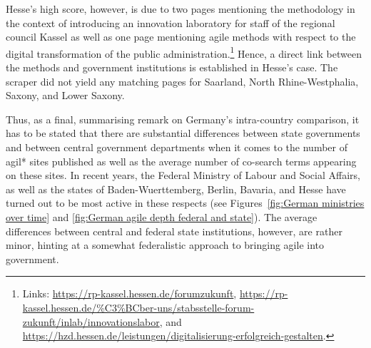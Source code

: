\noindent Hesse's high score, however, is due to two pages mentioning the methodology in the context of introducing an innovation laboratory for staff of the regional council Kassel as well as one page mentioning agile methods with respect to the digital transformation of the public administration.\footnote{Links: \url{https://rp-kassel.hessen.de/forumzukunft}, \url{https://rp-kassel.hessen.de/\%C3\%BCber-uns/stabsstelle-forum-zukunft/inlab/innovationslabor}, and \url{https://hzd.hessen.de/leistungen/digitalisierung-erfolgreich-gestalten}.} Hence, a direct link between the methods and government institutions is established in Hesse's case. The scraper did not yield any matching pages for Saarland, North Rhine-Westphalia, Saxony, and Lower Saxony.

Thus, as a final, summarising remark on Germany's intra-country comparison, it has to be stated that there are substantial differences between state governments and between central government departments when it comes to the number of agil* sites published as well as the average number of co-search terms appearing on these sites. In recent years, the Federal Ministry of Labour and Social Affairs, as well as the states of Baden-Wuerttemberg, Berlin, Bavaria, and Hesse have turned out to be most active in these respects (see Figures~\ref{fig:German ministries over time} and \ref{fig:German agile depth federal and state}). The average differences between central and federal state institutions, however, are rather minor, hinting at a somewhat federalistic approach to bringing agile into government.

